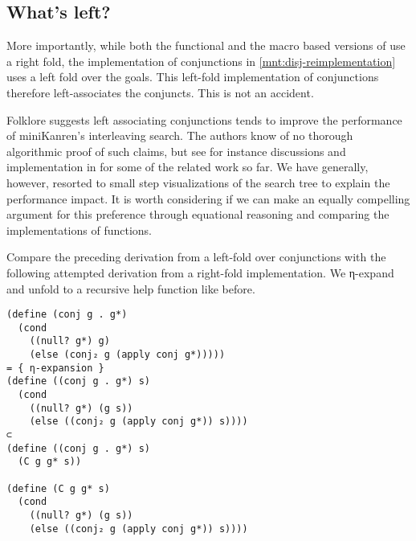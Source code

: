 \documentclass[sigplan,balance=true,pbalance=true,natbib=false]{acmart}
\begin{document}
\subsection{What's left?}\label{sec:whats-left}

More importantly, while both the functional and the macro based
versions of  use a right fold, the implementation of
conjunctions in \cref{mnt:disj-reimplementation} uses a left fold over
the goals. This left-fold implementation of conjunctions therefore
left-associates the conjuncts. This is not an accident.

%
Folklore suggests left associating conjunctions tends to improve the
performance of miniKanren's interleaving search. The authors know of
no thorough algorithmic proof of such claims, but see for instance
discussions and implementation in
\citet{rosenblatt2019first} for some of
the related work so far. We have generally, however, resorted to small
step visualizations of the search tree to explain the performance
impact. It is worth considering if we can make an equally compelling
argument for this preference through equational reasoning and
comparing the implementations of functions.



Compare the preceding derivation from a left-fold over conjunctions
with the following attempted derivation from a right-fold
implementation. We η-expand and unfold to a recursive help
function like before.

\begin{verbatim}
(define (conj g . g*)
  (cond
    ((null? g*) g)
    (else (conj₂ g (apply conj g*)))))
= { η-expansion }
(define ((conj g . g*) s)
  (cond
    ((null? g*) (g s))
    (else ((conj₂ g (apply conj g*)) s))))
⊂
(define ((conj g . g*) s)
  (C g g* s))

(define (C g g* s)
  (cond
    ((null? g*) (g s))
    (else ((conj₂ g (apply conj g*)) s))))
\end{verbatim}
\end{document}
